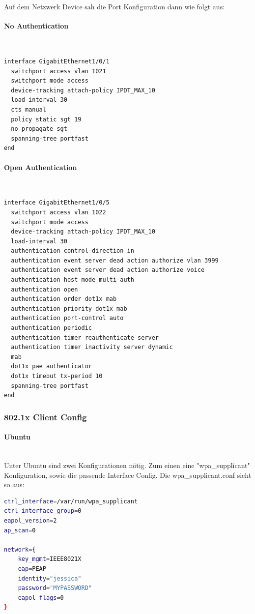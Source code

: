 Auf dem Netzwerk Device sah die Port Konfiguration dann wie folgt aus:

\paragraph{No Authentication}
~\\
\begin{lstlisting}[language=bash]
interface GigabitEthernet1/0/1
  switchport access vlan 1021
  switchport mode access
  device-tracking attach-policy IPDT_MAX_10
  load-interval 30
  cts manual 
  policy static sgt 19
  no propagate sgt
  spanning-tree portfast
end
\end{lstlisting}
\paragraph{Open Authentication}
~\\
\begin{lstlisting}[language=bash]
interface GigabitEthernet1/0/5
  switchport access vlan 1022
  switchport mode access
  device-tracking attach-policy IPDT_MAX_10
  load-interval 30
  authentication control-direction in
  authentication event server dead action authorize vlan 3999
  authentication event server dead action authorize voice
  authentication host-mode multi-auth
  authentication open
  authentication order dot1x mab
  authentication priority dot1x mab
  authentication port-control auto
  authentication periodic
  authentication timer reauthenticate server
  authentication timer inactivity server dynamic
  mab
  dot1x pae authenticator
  dot1x timeout tx-period 10
  spanning-tree portfast
end
\end{lstlisting}

\subsubsection{802.1x Client Config}

\paragraph{Ubuntu}
~\\

Unter Ubuntu sind zwei Konfigurationen nötig. Zum einen eine "wpa\_supplicant" Konfiguration, sowie die passende Interface Config.
Die wpa\_supplicant.conf sieht so aus:

\begin{lstlisting}[language=bash]
ctrl_interface=/var/run/wpa_supplicant
ctrl_interface_group=0
eapol_version=2
ap_scan=0

network={
	key_mgmt=IEEE8021X
	eap=PEAP
	identity="jessica"
	password="MYPASSWORD"
	eapol_flags=0
}
\end{lstlisting}

